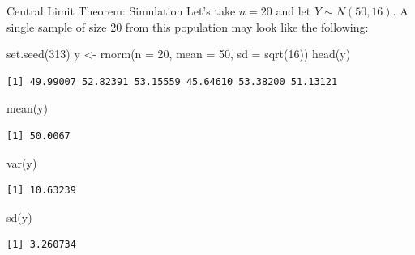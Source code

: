 \documentclass[
  ignorenonframetext,
]{beamer}
\newenvironment{Shaded}{\begin{snugshade}}{\end{snugshade}}
\newcommand{\AttributeTok}[1]{\textcolor[rgb]{0.40,0.45,0.13}{#1}}
\newcommand{\DecValTok}[1]{\textcolor[rgb]{0.68,0.00,0.00}{#1}}
\newcommand{\FunctionTok}[1]{\textcolor[rgb]{0.28,0.35,0.67}{#1}}
\newcommand{\NormalTok}[1]{\textcolor[rgb]{0.00,0.23,0.31}{#1}}
\newcommand{\OtherTok}[1]{\textcolor[rgb]{0.00,0.23,0.31}{#1}}
\begin{document}
\begin{frame}[fragile]{Central Limit Theorem: Simulation}
\protect{}\label{central-limit-theorem-simulation}
Let's take \(n=20\) and let \(Y\sim N(50, 16)\). A single sample of size
20 from this population may look like the following:

\begin{Shaded}
\begin{Highlighting}[]
\FunctionTok{set.seed}\NormalTok{(}\DecValTok{313}\NormalTok{)}
\NormalTok{y }\OtherTok{\textless{}{-}} \FunctionTok{rnorm}\NormalTok{(}\AttributeTok{n =} \DecValTok{20}\NormalTok{, }\AttributeTok{mean =} \DecValTok{50}\NormalTok{, }\AttributeTok{sd =} \FunctionTok{sqrt}\NormalTok{(}\DecValTok{16}\NormalTok{))}
\FunctionTok{head}\NormalTok{(y)}
\end{Highlighting}
\end{Shaded}

\begin{verbatim}
[1] 49.99007 52.82391 53.15559 45.64610 53.38200 51.13121
\end{verbatim}

\begin{Shaded}
\begin{Highlighting}[]
\FunctionTok{mean}\NormalTok{(y)}
\end{Highlighting}
\end{Shaded}

\begin{verbatim}
[1] 50.0067
\end{verbatim}

\begin{Shaded}
\begin{Highlighting}[]
\FunctionTok{var}\NormalTok{(y)}
\end{Highlighting}
\end{Shaded}

\begin{verbatim}
[1] 10.63239
\end{verbatim}

\begin{Shaded}
\begin{Highlighting}[]
\FunctionTok{sd}\NormalTok{(y)}
\end{Highlighting}
\end{Shaded}

\begin{verbatim}
[1] 3.260734
\end{verbatim}
\end{frame}
\end{document}
